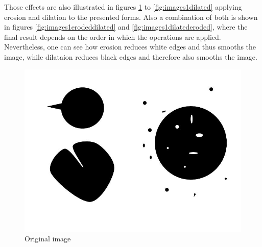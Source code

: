 Those effects are also illustrated in figures \ref{fig:images1}  to \ref{fig:images1dilated}  applying erosion and dilation to the presented forms. Also a combination of both is shown in figures \ref{fig:images1erodeddilated} and \ref{fig:images1dilatederoded}, where the final result depends on the order in which the operations are applied. Nevertheless, one can see how erosion reduces white edges and thus smooths the image, while dilataion reduces black edges and therefore also smooths the image. 

\begin{figure}[H]
	\centering
		\includegraphics[scale=0.2]{images/Images1.jpg}
		\caption{Original image}
		\label{fig:images1}
\end{figure}

